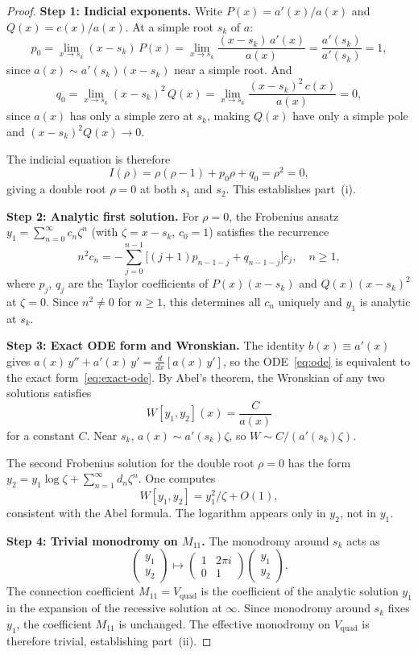 \documentclass[11pt,a4paper]{article}
\theoremstyle{definition}
\theoremstyle{remark}
\newcommand{\Vq}{V_{\mathrm{quad}}}
\begin{document}
\begin{proof}
\noindent\textbf{Step 1: Indicial exponents.}
Write $P(x) = a'(x)/a(x)$ and
$Q(x) = c(x)/a(x)$.
At a simple root $s_k$ of $a$:
\[
  p_0 = \lim_{x\to s_k}
  (x-s_k)\,P(x)
  = \lim_{x\to s_k}
  \frac{(x-s_k)\,a'(x)}{a(x)}
  = \frac{a'(s_k)}{a'(s_k)}
  = 1,
\]
since $a(x) \sim a'(s_k)(x-s_k)$
near a simple root. And
\[
  q_0 = \lim_{x\to s_k}
  (x-s_k)^2\,Q(x)
  = \lim_{x\to s_k}
  \frac{(x-s_k)^2\,c(x)}{a(x)}
  = 0,
\]
since $a(x)$ has only a simple zero
at $s_k$, making $Q(x)$ have only a
simple pole and $(x-s_k)^2 Q(x) \to 0$.

The indicial equation is therefore
\[
  I(\rho) = \rho(\rho-1)
  + p_0\rho + q_0
  = \rho^2 = 0,
\]
giving a double root $\rho = 0$
at both $s_1$ and $s_2$.
This establishes part~(i).

\medskip
\noindent\textbf{Step 2: Analytic
first solution.}
For $\rho = 0$, the Frobenius ansatz
$y_1 = \sum_{n=0}^\infty c_n \zeta^n$
(with $\zeta = x - s_k$, $c_0 = 1$)
satisfies the recurrence
\[
  n^2 c_n = -\sum_{j=0}^{n-1}
  \bigl[(j+1)p_{n-1-j}
  + q_{n-1-j}\bigr] c_j,
  \quad n \geq 1,
\]
where $p_j$, $q_j$ are the Taylor
coefficients of $P(x)(x-s_k)$ and
$Q(x)(x-s_k)^2$ at $\zeta=0$.
Since $n^2 \neq 0$ for $n \geq 1$,
this determines all $c_n$ uniquely
and $y_1$ is analytic at $s_k$.

\medskip
\noindent\textbf{Step 3: Exact ODE form
and Wronskian.}
The identity $b(x) \equiv a'(x)$ gives
$a(x)\,y'' + a'(x)\,y'
= \frac{d}{dx}[a(x)\,y']$,
so the ODE~\eqref{eq:ode} is equivalent
to the exact form~\eqref{eq:exact-ode}.
By Abel's theorem, the Wronskian of any
two solutions satisfies
\[
  W[y_1, y_2](x) = \frac{C}{a(x)}
\]
for a constant $C$.
Near $s_k$, $a(x) \sim a'(s_k)\zeta$,
so $W \sim C/(a'(s_k)\zeta)$.

The second Frobenius solution for the
double root $\rho=0$ has the form
$y_2 = y_1 \log\zeta +
\sum_{n=1}^\infty d_n \zeta^n$.
One computes
\[
  W[y_1, y_2]
  = y_1^2/\zeta + O(1),
\]
consistent with the Abel formula.
The logarithm appears only in $y_2$,
not in $y_1$.

\medskip
\noindent\textbf{Step 4: Trivial
monodromy on $M_{11}$.}
The monodromy around $s_k$ acts as
\[
  \begin{pmatrix} y_1 \\ y_2
  \end{pmatrix}
  \mapsto
  \begin{pmatrix} 1 & 2\pi i \\
  0 & 1
  \end{pmatrix}
  \begin{pmatrix} y_1 \\ y_2
  \end{pmatrix}.
\]
The connection coefficient
$M_{11} = \Vq$ is the coefficient of
the analytic solution $y_1$ in the
expansion of the recessive solution at
$\infty$. Since monodromy around $s_k$
fixes $y_1$, the coefficient $M_{11}$
is unchanged. The effective monodromy on
$\Vq$ is therefore trivial,
establishing part~(ii).


\end{proof}
\end{document}
